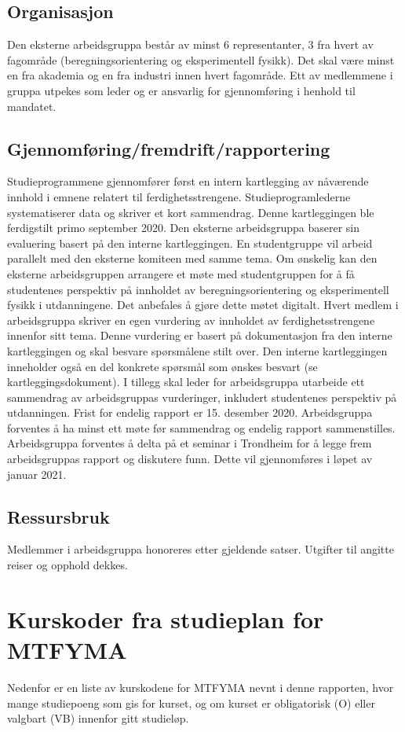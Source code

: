 \documentclass{article}
\begin{document}
\subsection{Organisasjon}
Den eksterne arbeidsgruppa består av minst 6 representanter, 3 fra hvert av fagområde (beregningsorientering og eksperimentell fysikk). Det skal være minst en fra akademia og en fra industri innen hvert fagområde.
Ett av medlemmene i gruppa utpekes som leder og er ansvarlig for gjennomføring i henhold til mandatet.

\subsection{Gjennomføring/fremdrift/rapportering}
Studieprogrammene gjennomfører først en intern kartlegging av nåværende innhold i emnene relatert til ferdighetsstrengene. Studieprogramlederne systematiserer data og skriver et kort sammendrag. Denne kartleggingen ble ferdigstilt primo september 2020.
Den eksterne arbeidsgruppa baserer sin evaluering basert på den interne kartleggingen. En studentgruppe vil arbeid parallelt med den eksterne komiteen med samme tema. Om ønskelig kan den eksterne arbeidsgruppen arrangere et møte med studentgruppen for å få studentenes perspektiv på innholdet av beregningsorientering og eksperimentell fysikk i utdanningene. Det anbefales å gjøre dette møtet digitalt.
Hvert medlem i arbeidsgruppa skriver en egen vurdering av innholdet av ferdighetsstrengene innenfor sitt tema. Denne vurdering er basert på dokumentasjon fra den interne kartleggingen og skal besvare spørsmålene stilt over. Den interne kartleggingen inneholder også en del konkrete spørsmål som ønskes besvart (se kartleggingsdokument).
I tillegg skal leder for arbeidsgruppa utarbeide ett sammendrag av arbeidsgruppas vurderinger, inkludert studentenes perspektiv på utdanningen.
Frist for endelig rapport er 15. desember 2020.
Arbeidsgruppa forventes å ha minst ett møte før sammendrag og endelig rapport sammenstilles.
Arbeidsgruppa forventes å delta på et seminar i Trondheim for å legge frem arbeidsgruppas rapport og diskutere funn. Dette vil gjennomføres i løpet av januar 2021.

\subsection{Ressursbruk}
Medlemmer i arbeidsgruppa honoreres etter gjeldende satser.
Utgifter til angitte reiser og opphold dekkes.

\clearpage
\section{Kurskoder fra studieplan for MTFYMA}
Nedenfor er en liste av kurskodene for MTFYMA nevnt i denne rapporten, hvor mange studiepoeng som gis for kurset, og om kurset er obligatorisk (O) eller valgbart (VB) innenfor gitt studieløp.
\end{document}
